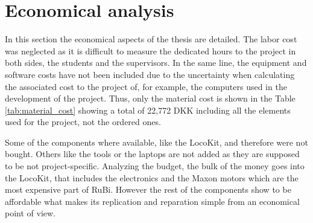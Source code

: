 \chapter{Economical analysis} %
\label{cha:economical_aspects}
In this section the economical aspects of the thesis are detailed.
The labor cost was neglected as it is difficult to measure the dedicated hours to the project in both sides, the students and the supervisors.
In the same line, the equipment and software costs have not been included due to the uncertainty when calculating the associated cost to the project of, for example, the computers used in the development of the project.
Thus, only the material cost is shown in the Table \ref{tab:material_cost} showing a total of 22,772 DKK including all the elements used for the project, not the ordered ones.

Some of the components where available, like the LocoKit, and therefore were not bought.
Others like the tools or the laptops are not added as they are supposed to be not project-specific.
Analyzing the budget, the bulk of the money goes into the LocoKit, that includes the electronics and the Maxon motors which are the most expensive part of RuBi.
However the rest of the components show to be affordable what makes its replication and reparation simple from an economical point of view.

\newpage \mbox{}

